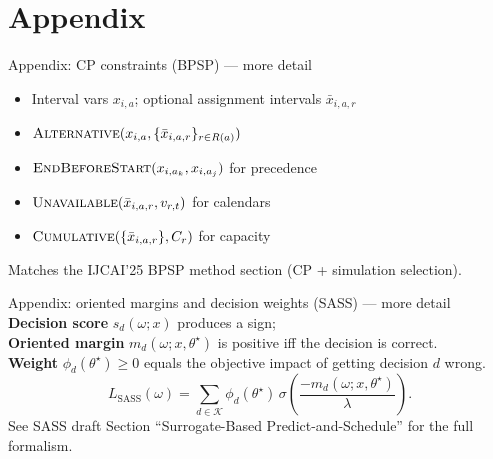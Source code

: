 \documentclass[aspectratio=169,10pt]{beamer}
\newcommand{\btext}[1]{\textbf{\color{darkred}#1}}
\newcommand{\smallref}[1]{{\scriptsize\color{darkgray}#1}}
\begin{document}
\appendix
\section{Appendix}

\begin{frame}{Appendix: CP constraints (BPSP) — more detail}
  \scriptsize
  \begin{itemize}
    \item Interval vars \(x_{i,a}\); optional assignment intervals \(\bar{x}_{i,a,r}\)
    \item \(\textsc{Alternative}(x_{i,a}, \{\bar{x}_{i,a,r}\}_{r\in R(a)})\)
    \item \(\textsc{EndBeforeStart}(x_{i,a_k},x_{i,a_j})\) for precedence
    \item \(\textsc{Unavailable}(\bar{x}_{i,a,r}, v_{r,t})\) for calendars
    \item \(\textsc{Cumulative}(\{\bar{x}_{i,a,r}\}, C_r)\) for capacity
  \end{itemize}
  \smallref{Matches the IJCAI'25 BPSP method section (CP + simulation selection).}
\end{frame}

\begin{frame}{Appendix: oriented margins and decision weights (SASS) — more detail}
  \scriptsize
  \btext{Decision score} \(s_d(\omega;x)\) produces a sign;\\
  \btext{Oriented margin} \(m_d(\omega;x,\theta^\star)\) is positive iff the decision is correct.\\
  \btext{Weight} \(\phi_d(\theta^\star)\ge 0\) equals the objective impact of getting decision \(d\) wrong.\\
  \[
    L_{\mathrm{SASS}}(\omega)
    =
    \sum_{d\in\mathcal{K}}
      \phi_d(\theta^\star)\,
      \sigma\!\left(\frac{-m_d(\omega;x,\theta^\star)}{\lambda}\right).
  \]
  \smallref{See SASS draft Section ``Surrogate-Based Predict-and-Schedule'' for the full formalism.}
\end{frame}
\end{document}
